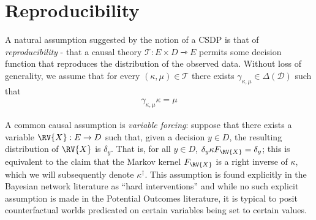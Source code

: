 
\section{Reproducibility}

A natural assumption suggested by the notion of a CSDP is that of \emph{reproducibility} - that a causal theory $\mathscr{T}:E\times D\rightarrowtriangle E$ permits some decision function that reproduces the distribution of the observed data. Without loss of generality, we assume that for every $(\kappa,\mu)\in \mathscr{T}$ there exists $\gamma_{\kappa,\mu}\in \Delta(\mathcal{D})$ such that
\begin{align}
	\gamma_{\kappa,\mu}\kappa = \mu
\end{align}

A common causal assumption is \emph{variable forcing}: suppose that there exists a variable $\RV{X}:E\to D$ such that, given a decision $y \in D$, the resulting distribution of $\RV{X}$ is $\delta_y$. That is, for all $y\in D$, $\delta_y\kappa F_{\RV{X}} = \delta_y$; this is equivalent to the claim that the Markov kernel $F_{\RV{X}}$ is a right inverse of $\kappa$, which we will subsequently denote $\kappa^\dagger$. This assumption is found explicitly in the Bayesian network literature as ``hard interventions'' and while no such explicit assumption is made in the Potential Outcomes literature, it is typical to posit counterfactual worlds predicated on certain variables being set to certain values.

